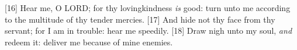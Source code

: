 [16] \textcolor[cmyk]{0.99998,1,0,0}{Hear me, O LORD; for thy lovingkindness \emph{is} good: turn unto me according to the multitude of thy tender mercies.} %
[17] \textcolor[cmyk]{0.99998,1,0,0}{And hide not thy face from thy servant; for I am in trouble: hear me speedily.} %
[18] \textcolor[cmyk]{0.99998,1,0,0}{Draw nigh unto my soul, \emph{and} redeem it: deliver me because of mine enemies.} %
